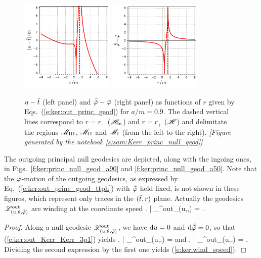 \begin{figure}
\centerline{\includegraphics[width=0.4\textwidth]{ker_u_r.pdf}\qquad
\includegraphics[width=0.4\textwidth]{ker_ttphi_r.pdf}
}
\caption[]{\label{f:ker:u_ttphi_r} \footnotesize
$u - {\tilde t}$ (left panel) and $\tilde{{\tilde\varphi}} - {\tilde\varphi}$ (right panel) as functions
of $r$ given by Eqs.~(\ref{e:ker:out_princ_geod}) for $a/m = 0.9$.
The dashed vertical lines
correspond to $r=r_-$ ($\mathscr{H}_{\rm in}$) and $r=r_+$ ($\mathscr{H}$) and
delimitate the regions $\mathscr{M}_{\rm III}$, $\mathscr{M}_{\rm II}$ and $\mathscr{M}_{\rm I}$ (from
the left to the right).
\textsl{[Figure generated by the notebook \ref{s:sam:Kerr_princ_null_geod}]}
}
\end{figure}


The outgoing principal null geodesics
are depicted, along with the
ingoing ones, in Figs.~\ref{f:ker:princ_null_geod_a90} and
\ref{f:ker:princ_null_geod_a50}. Note that the ${\tilde\varphi}$-motion of the
outgoing geodesics, as expressed by Eq.~(\ref{e:ker:out_princ_geod_ttph}) with $\tilde{{\tilde\varphi}}$
held fixed, is not shown in these figures, which represent only traces
in the $({\tilde t},r)$ plane. Actually the geodesics $\mathscr{L}^{\rm out}_{(u,\theta,\tilde{{\tilde\varphi}})}$
are winding at the coordinate speed
\be \label{e:ker:wind_speed}
    \left. \frac{\D\tph}{\D\ti} \right| _{\Li^{\rm out}_{(u,\th,\tilde{\tph})}} =
     .
\ee
\begin{proof}
Along a null geodesic $\mathscr{L}^{\rm out}_{(u,\theta,\tilde{{\tilde\varphi}})}$, we have
$\mathrm{d} u = 0$ and $\mathrm{d}\tilde{{\tilde\varphi}}=0$, so that (\ref{e:ker:out_Kerr_Kerr_3p1}) yields
\be \label{e:ker:dtdr_dphdr_out}
\left.  \right| _{\Li^{\rm out}_{(u,\th,\tilde{\tph})}}  =     \qquad\mbox{and}\qquad
\left.  \right| _{\Li^{\rm out}_{(u,\th,\tilde{\tph})}} =  .
\ee
Dividing the second expression by the first one yields (\ref{e:ker:wind_speed}).
\end{proof}

